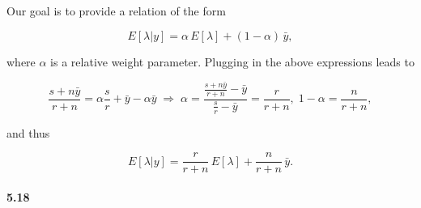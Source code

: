 \documentclass[fontsize=11pt,DIV=18,parskip=half]{scrartcl}
\begin{document}
Our goal is to provide a relation of the form

\begin{equation*}
E[\lambda|y] = \alpha \, E[\lambda] + (1-\alpha) \, \bar{y},
\end{equation*}

where $\alpha$ is a relative weight parameter. Plugging in the above expressions leads to

\begin{equation*}
\frac{s+n\bar{y}}{r+n} = \alpha \frac{s}{r} + \bar{y} - \alpha \bar{y} \; \Rightarrow \; \alpha = \frac{\frac{s+n\bar{y}}{r+n}-\bar{y}}{\frac{s}{r}-\bar{y}} = \frac{r}{r+n}, \; 1-\alpha = \frac{n}{r+n},
\end{equation*}

and thus

\begin{equation*}
E[\lambda|y] = \frac{r}{r+n} \, E[\lambda] + \frac{n}{r+n} \, \bar{y}.
\end{equation*}


\paragraph{5.18}
\end{document}
